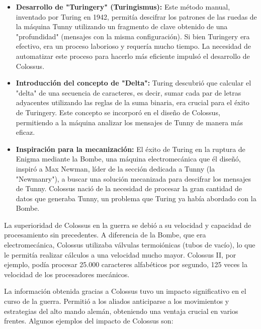 \documentclass{article}
\begin{document}
\begin{itemize}
    \item \textbf{Desarrollo de "Turingery" (Turingismus):} Este 
    método manual, 
    inventado por Turing en 1942, permitía descifrar 
    los patrones de las ruedas de la máquina 
    Tunny utilizando un fragmento de clave obtenido de 
    una "profundidad" 
    (mensajes con la misma configuración). Si bien Turingery 
    era efectivo, era un proceso 
    laborioso y requería mucho tiempo. La necesidad de 
    automatizar este proceso para hacerlo 
    más eficiente impulsó el desarrollo de 
    Colossus.\cite{ColossusO}\cite{AlanTuringEnigmaO}
    
    \item \textbf{Introducción del concepto de "Delta":} Turing 
    descubrió que calcular el "delta" 
    de una secuencia de caracteres, es decir, sumar cada 
    par de letras adyacentes utilizando las 
    reglas de la suma binaria, era crucial para el éxito 
    de Turingery. Este concepto se incorporó 
    en el diseño de Colossus, permitiendo a la máquina 
    analizar los mensajes de Tunny de manera más 
    eficaz.\cite{ColossusO}\cite{AlanTuringEnigmaO}
    
    \item \textbf{Inspiración para la mecanización:} El éxito 
    de Turing en la ruptura de Enigma mediante la Bombe, 
    una máquina electromecánica que él diseñó, inspiró 
    a Max Newman, líder de la sección dedicada a Tunny 
    (la "Newmanry"), a buscar una solución mecanizada 
    para descifrar los mensajes de Tunny. Colossus nació 
    de la necesidad de procesar la gran cantidad de datos 
    que generaba Tunny, un problema que Turing ya había 
    abordado con la Bombe.\cite{ColossusO}\cite{AlanTuringEnigmaO}
\end{itemize}

La superioridad de Colossus en la guerra se debió a su velocidad y capacidad de procesamiento 
sin precedentes. A diferencia de la Bombe, que era electromecánica, Colossus utilizaba válvulas 
termoiónicas (tubos de vacío), lo que le permitía realizar cálculos a una velocidad mucho mayor. 
Colossus II, por ejemplo, podía procesar 25.000 caracteres alfabéticos por segundo, 125 veces la
 velocidad de los procesadores mecánicos.\cite{ColossusO}

La información obtenida gracias a Colossus tuvo un 
impacto significativo en el curso de la guerra.
Permitió a los aliados anticiparse a los movimientos 
y estrategias del alto mando alemán, 
obteniendo una ventaja crucial en varios 
frentes.\cite{ColossusO} Algunos ejemplos del 
impacto de Colossus son:
\end{document}
